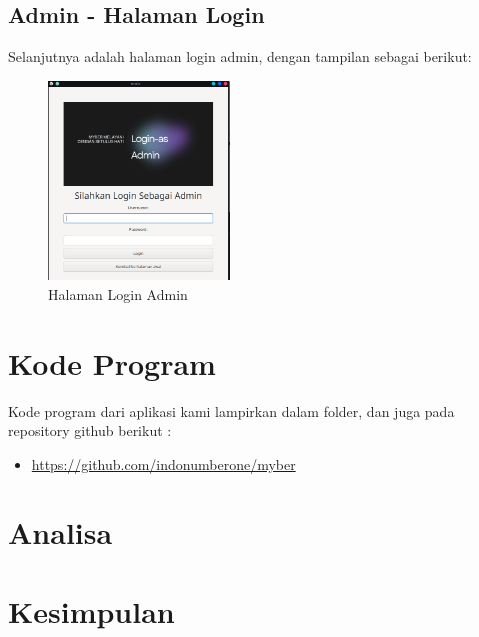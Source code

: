 \documentclass[a4paper,12pt]{article}
\begin{document}
\subsection{Admin - Halaman Login}
Selanjutnya adalah halaman login admin, dengan tampilan sebagai berikut:
\begin{figure}[!htbp]
    \centering
    \includegraphics[width=0.43\textwidth]{./Login_admin.png}
    \caption{Halaman Login Admin}

\end{figure}
\FloatBarrier 

\section{Kode Program}
Kode program dari aplikasi kami lampirkan dalam folder, dan juga pada repository github berikut :
\begin{itemize}
    \item \url{https://github.com/indonumberone/myber}
\end{itemize}

\section{Analisa}

\section{Kesimpulan}
\end{document}
